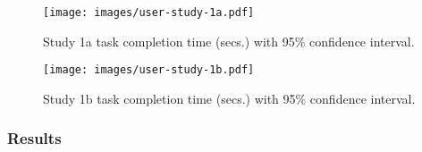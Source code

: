 



\begin{figure}[ht]
    \centering
    \texttt{[image: images/user-study-1a.pdf]}
    \caption{Study 1a task completion time (secs.) with 95\% confidence interval.}
    \label{fig:analysis-1a}
\end{figure}


\begin{figure}[ht]
    \centering
    \texttt{[image: images/user-study-1b.pdf]}
    \caption{Study 1b task completion time (secs.) with 95\% confidence interval.}
    \label{fig:analysis-1b}
\end{figure}

\subsubsection*{\textbf {Results}}

